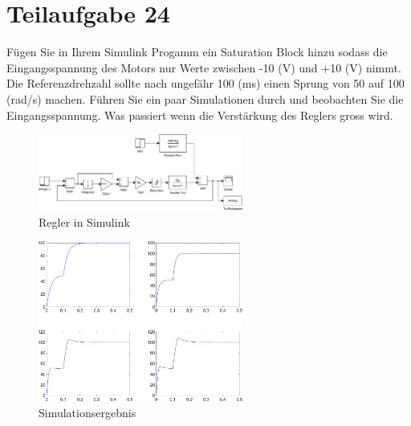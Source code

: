 \section{Teilaufgabe 24}
\begin{aufgabe}
    Fügen Sie in Ihrem Simulink Progamm ein Saturation Block hinzu sodass die 
    Eingangsspannung des Motors nur Werte zwischen -10 (V) und +10 (V) nimmt. 
    Die Referenzdrehzahl sollte nach ungefähr 100 (ms) einen Sprung von 50 auf 
    100 (rad/s) machen. Führen Sie ein paar Simulationen durch und beobachten 
    Sie die Eingangsspannung. Was passiert wenn die Verstärkung des Reglers 
    gross wird.
\end{aufgabe}
\begin{figure}[h!]
    \centering
    \includegraphics[width=0.6\textwidth]{24/regler_sat.pdf}
    \caption{Regler in Simulink}
    \label{fig:24}
\end{figure}
\begin{figure}[h!]
    \centering
    \includegraphics[width=0.6\textwidth]{24/regler_sat_plot.pdf}
    \caption{Simulationsergebnis}
    \label{fig:24plot}
\end{figure}
